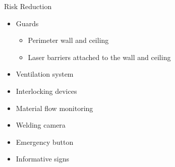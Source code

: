\begin{frame}{Risk Reduction}
\begin{itemize}
    \item Guards
        \begin{itemize}
            \item Perimeter wall and ceiling
            \item Laser barriers attached to the wall and ceiling %
        \end{itemize}
    \item Ventilation system
    \item Interlocking devices
    \item Material flow monitoring
    \item Welding camera
    \item Emergency button
    \item Informative signs
\end{itemize}
\end{frame}